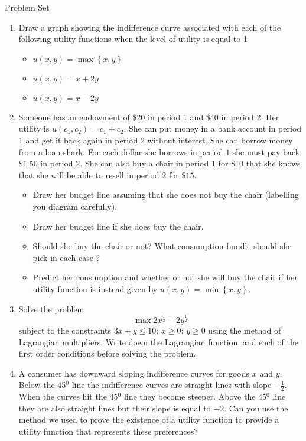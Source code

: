 \documentclass[12pt]{article}
\begin{document}
\begin{center}
Problem Set
\end{center}

\begin{enumerate}
\item  Draw a graph showing the indifference curve associated with each of the
following utility functions when the level of utility is equal to 1

\begin{itemize}
\item $u\left(  x,y\right)  =\max\left\{  x,y\right\}  $

\item $u\left(  x,y\right)  =x+2y$

\item $u\left(  x,y\right)  =x-2y$
\end{itemize}

\item  Someone has an endowment of \$20 in period 1 and \$40 in period 2. Her
utility is $u\left(  c_{1},c_{2}\right)  =c_{1}+c_{2}$. She can put money in a
bank account in period 1 and get it back again in period 2 without interest.
She can borrow money from a loan shark. For each dollar she borrows in period
$1$ she must pay back $\$1.50$ in period $2$. She can also buy a chair in
period 1 for \$10 that she knows that she will be able to resell in period $2$
for $\$15$.

\begin{itemize}
\item  Draw her budget line assuming that she does not buy the chair
(labelling you diagram carefully).

\item  Draw her budget line if she does buy the chair.

\item  Should she buy the chair or not? What consumption bundle should she
pick in each case ?

\item  Predict her consumption and whether or not she will buy the chair if
her utility function is instead given by $u\left(  x,y\right)  =\min\left\{
x,y\right\}  $.
\end{itemize}

\item  Solve the problem
\[
\max2x^{\frac{1}{2}}+2y^{\frac{1}{2}}%
\]
subject to the constraints $3x+y\leq10$; $x\geq0$; $y\geq0$ using the method
of Lagrangian multipliers. Write down the Lagrangian function, and each of the
first order conditions before solving the problem.

\item  A consumer has downward sloping indifference curves for goods $x$ and
$y$. Below the 45$^{0}$ line the indifference curves are straight lines with
slope $-\frac{1}{2}$. When the curves hit the 45$^{0}$ line they become
steeper. Above the 45$^{0}$ line they are also straight lines but their slope
is equal to $-2$. Can you use the method we used to prove the existence of a
utility function to provide a utility function that represents these preferences?
\end{enumerate}
\end{document}
